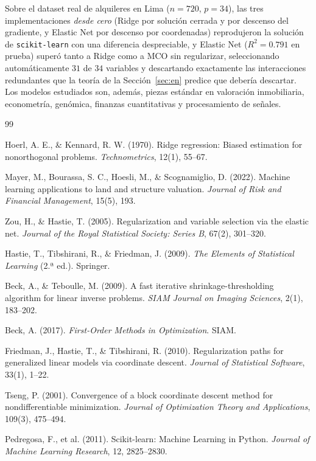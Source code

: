 \documentclass[11pt,a4paper]{article}
\theoremstyle{simple}
\begin{document}
Sobre el dataset real de alquileres en Lima ($n=720$, $p=34$), las tres implementaciones \emph{desde cero} (Ridge por solución cerrada y por descenso del gradiente, y Elastic Net por descenso por coordenadas) reprodujeron la solución de \texttt{scikit-learn} con una diferencia despreciable, y Elastic Net ($R^2=0.791$ en prueba) superó tanto a Ridge como a MCO sin regularizar, seleccionando automáticamente $31$ de $34$ variables y descartando exactamente las interacciones redundantes que la teoría de la Sección~\ref{sec:en} predice que debería descartar. Los modelos estudiados son, además, piezas estándar en valoración inmobiliaria, econometría, genómica, finanzas cuantitativas y procesamiento de señales.

\begin{thebibliography}{99}

 Hoerl, A. E., \& Kennard, R. W. (1970). Ridge regression: Biased estimation for nonorthogonal problems. \emph{Technometrics}, 12(1), 55--67.

 Mayer, M., Bourassa, S. C., Hoesli, M., \& Scognamiglio, D. (2022). Machine learning applications to land and structure valuation. \emph{Journal of Risk and Financial Management}, 15(5), 193.

 Zou, H., \& Hastie, T. (2005). Regularization and variable selection via the elastic net. \emph{Journal of the Royal Statistical Society: Series B}, 67(2), 301--320.

 Hastie, T., Tibshirani, R., \& Friedman, J. (2009). \emph{The Elements of Statistical Learning} (2.ª ed.). Springer.

 Beck, A., \& Teboulle, M. (2009). A fast iterative shrinkage-thresholding algorithm for linear inverse problems. \emph{SIAM Journal on Imaging Sciences}, 2(1), 183--202.

 Beck, A. (2017). \emph{First-Order Methods in Optimization}. SIAM.

 Friedman, J., Hastie, T., \& Tibshirani, R. (2010). Regularization paths for generalized linear models via coordinate descent. \emph{Journal of Statistical Software}, 33(1), 1--22.

 Tseng, P. (2001). Convergence of a block coordinate descent method for nondifferentiable minimization. \emph{Journal of Optimization Theory and Applications}, 109(3), 475--494.

 Pedregosa, F., et al. (2011). Scikit-learn: Machine Learning in Python. \emph{Journal of Machine Learning Research}, 12, 2825--2830.

\end{thebibliography}
\end{document}
